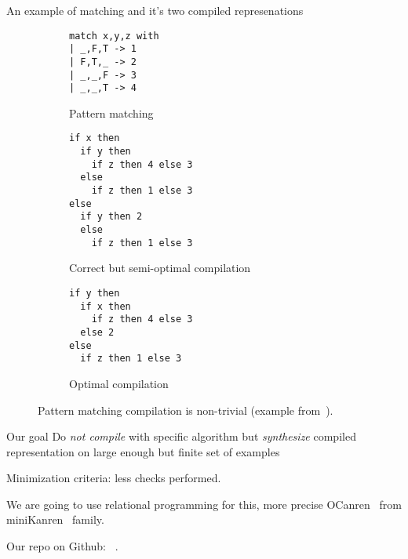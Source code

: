 \documentclass[aspectratio=169
  , xcolor={svgnames}
  , hyperref={ colorlinks,citecolor=Blue
             , linkcolor=DarkRed,urlcolor=DarkBlue}
  , russian
  ]{beamer}
\begin{document}
\begin{frame}[fragile]{An example of matching and it's two compiled represenations}
\begin{figure}[ht]
\begin{subfigure}[b]{0.2\linewidth}
\centering
\begin{lstlisting}
match x,y,z with
| _,F,T -> 1
| F,T,_ -> 2
| _,_,F -> 3
| _,_,T -> 4
\end{lstlisting}
\caption{Pattern matching}
\end{subfigure}
\hspace{0.5cm}
\begin{subfigure}[b]{0.32\linewidth}
\centering
\begin{lstlisting}
if x then
  if y then
    if z then 4 else 3
  else
    if z then 1 else 3
else
  if y then 2
  else
    if z then 1 else 3
\end{lstlisting}
\caption{Correct but semi-optimal compilation}
\label{fig:matching-example2}
\end{subfigure}
\hspace{0.5cm}
\begin{subfigure}[b]{0.35\linewidth}
\centering
\begin{lstlisting}
if y then
  if x then
    if z then 4 else 3
  else 2
else
  if z then 1 else 3
\end{lstlisting}
\caption{Optimal compilation}
\label{fig:matching-example3}
\end{subfigure}
\caption{Pattern matching compilation is non-trivial (example from~\cite{maranget2008}).}
\label{fig:match-example}
\end{figure}
\end{frame}

\begin{frame}{Our goal}
Do \emph{not compile} with specific algorithm but \emph{synthesize} compiled representation on large enough but finite set of examples
\vspace{1cm}

Minimization criteria: less checks performed.
\vspace{1cm}

We are going to use relational programming for this, more precise OCanren~\cite{OCanrenWeb} from miniKanren~\cite{MiniKanrenWeb} family.
\vspace{1cm}


Our repo on Github: ~\cite{Repo}.
\end{frame}
\end{document}
